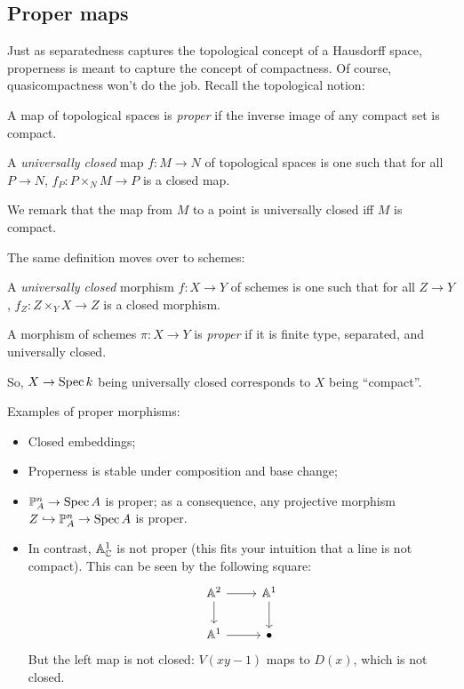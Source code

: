 \documentclass[11pt]{amsart}
\begin{document}
\subsection{Proper maps}

Just as separatedness captures the topological concept of a Hausdorff space, properness is meant to capture the concept of compactness. Of course, quasicompactness won't do the job. Recall the topological notion:

\begin{defn}
A map of topological spaces is \emph{proper} if the inverse image of any compact set is compact.
\end{defn}

\begin{defn}
A \emph{universally closed} map $f:M\to N$ of topological spaces is one such that for all $P\to N$, $f_P: P\times_N M \to P$ is a closed map.
\end{defn}

We remark that the map from $M$ to a point is universally closed iff $M$ is compact.

The same definition moves over to schemes:

\begin{defn}
A \emph{universally closed} morphism $f:X\to Y$ of schemes is one such that for all $Z\to Y$, $f_Z: Z\times_Y X \to Z$ is a closed morphism.
\end{defn}

\begin{defn}
A morphism of schemes $\pi: X\to Y$ is \emph{proper} if it is finite type, separated, and universally closed. 
\end{defn}

So, $X\to \operatorname{Spec} k$ being universally closed corresponds to $X$ being ``compact''.

\begin{exm}
Examples of proper morphisms:
\begin{itemize}
    \item Closed embeddings;
    \item Properness is stable under composition and base change;
    \item $\mathbb{P}^n_A\to \operatorname{Spec} A$ is proper; as a consequence, any projective morphism $Z\hookrightarrow \mathbb{P}^n_A\to \operatorname{Spec} A$ is proper.
    \item In contrast, $\mathbb{A}^1_{\mathbb{C}}$ is not proper (this fits your intuition that a line is not compact). This can be seen by the following square:
    \[
    \begin{tikzcd}
    \AA^2 \arrow[r] \arrow[d] & \AA^1 \arrow[d] \\
    \AA^1 \arrow[r] & \bullet
    \end{tikzcd}
    \]
    But the left map is not closed: $V(xy - 1)$ maps to $D(x)$, which is not closed.
\end{itemize}
\end{exm}
\end{document}
